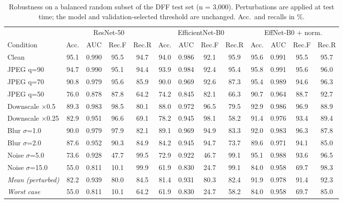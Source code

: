 \begin{table}[!t]
\centering
\caption{Robustness on a balanced random subset of the DFF test set (n = 3,000). Perturbations are applied at test time; the model and validation-selected threshold are unchanged. Acc.\ and recalls in \%.}
\label{tab:robust_dff}
\setlength{\tabcolsep}{2.6pt}
\footnotesize
\begin{tabular}{lcccccccccccc}
\toprule
 & \multicolumn{4}{c}{ResNet-50} & \multicolumn{4}{c}{EfficientNet-B0} & \multicolumn{4}{c}{EffNet-B0 + norm.} \\
\cmidrule(lr){2-5}\cmidrule(lr){6-9}\cmidrule(lr){10-13}
Condition & Acc. & AUC & Rec.F & Rec.R & Acc. & AUC & Rec.F & Rec.R & Acc. & AUC & Rec.F & Rec.R \\
\midrule
Clean & 95.1 & 0.990 & 95.5 & 94.7 & 94.0 & 0.986 & 92.1 & 95.9 & 95.6 & 0.991 & 95.5 & 95.7 \\
JPEG q=90 & 94.7 & 0.990 & 95.1 & 94.4 & 93.9 & 0.984 & 92.4 & 95.4 & 95.8 & 0.991 & 95.6 & 96.0 \\
JPEG q=70 & 90.8 & 0.979 & 95.6 & 85.9 & 90.0 & 0.969 & 92.6 & 87.3 & 95.4 & 0.989 & 94.6 & 96.3 \\
JPEG q=50 & 76.0 & 0.878 & 87.8 & 64.2 & 74.2 & 0.845 & 82.1 & 66.3 & 90.7 & 0.964 & 88.7 & 92.7 \\
Downscale $\times$0.5 & 89.3 & 0.983 & 98.5 & 80.1 & 88.0 & 0.972 & 96.5 & 79.5 & 92.9 & 0.986 & 96.9 & 88.9 \\
Downscale $\times$0.25 & 82.9 & 0.951 & 96.6 & 69.1 & 78.2 & 0.945 & 98.1 & 58.2 & 91.4 & 0.976 & 93.4 & 89.4 \\
Blur $\sigma$=1.0 & 90.0 & 0.979 & 97.9 & 82.1 & 89.1 & 0.969 & 94.9 & 83.3 & 92.0 & 0.983 & 96.3 & 87.8 \\
Blur $\sigma$=2.0 & 87.6 & 0.952 & 90.3 & 84.9 & 84.2 & 0.945 & 94.7 & 73.7 & 89.6 & 0.971 & 94.1 & 85.0 \\
Noise $\sigma$=5.0 & 73.6 & 0.928 & 47.7 & 99.5 & 72.9 & 0.922 & 46.7 & 99.1 & 95.1 & 0.988 & 93.6 & 96.5 \\
Noise $\sigma$=15.0 & 55.0 & 0.811 & 10.1 & 99.9 & 61.9 & 0.830 & 24.7 & 99.1 & 84.0 & 0.958 & 69.7 & 98.3 \\
\midrule
\textit{Mean (perturbed)} & 82.2 & 0.939 & 80.0 & 84.5 & 81.4 & 0.931 & 80.3 & 82.4 & 91.9 & 0.978 & 91.4 & 92.3 \\
\textit{Worst case} & 55.0 & 0.811 & 10.1 & 64.2 & 61.9 & 0.830 & 24.7 & 58.2 & 84.0 & 0.958 & 69.7 & 85.0 \\
\bottomrule
\end{tabular}
\end{table}
